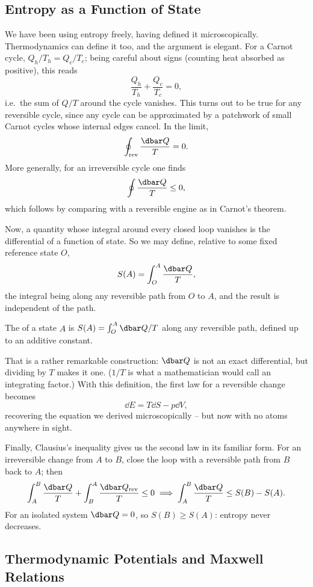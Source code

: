 \subsection{Entropy as a Function of State}

We have been using entropy freely, having defined it microscopically. Thermodynamics can define it too, and the argument is elegant. For a Carnot cycle, $Q_h/T_h = Q_c/T_c$; being careful about signs (counting heat absorbed as positive), this reads
$$
\frac{Q_h}{T_h} + \frac{Q_c}{T_c} = 0,
$$
i.e.\ the sum of $Q/T$ around the cycle vanishes. This turns out to be true for any reversible cycle, since any cycle can be approximated by a patchwork of small Carnot cycles whose internal edges cancel. In the limit,
$$
\oint_{\mathrm{rev}}\frac{\dbar Q}{T} = 0.
$$
More generally, for an irreversible cycle one finds 
$$
\oint \frac{\dbar Q}{T} \leq 0,
$$
which follows by comparing with a reversible engine as in Carnot's theorem.

Now, a quantity whose integral around every closed loop vanishes is the differential of a function of state. So we may define, relative to some fixed reference state $O$,
$$
S(A) = \int_O^A \frac{\dbar Q}{T},
$$
the integral being along any reversible path from $O$ to $A$, and the result is independent of the path.

\begin{definition}
	The  of a state $A$ is $S(A) = \int_O^A \dbar Q/T$ along any reversible path, defined up to an additive constant.
\end{definition}

That is a rather remarkable construction: $\dbar Q$ is not an exact differential, but dividing by $T$ makes it one. ($1/T$ is what a mathematician would call an integrating factor.) With this definition, the first law for a reversible change becomes
$$
\dd E = T\dd S - p\dd V,
$$
recovering the equation we derived microscopically -- but now with no atoms anywhere in sight.

Finally, Clausius's inequality gives us the second law in its familiar form. For an irreversible change from $A$ to $B$, close the loop with a reversible path from $B$ back to $A$; then
$$
\int_A^B \frac{\dbar Q}{T} + \int_B^A \frac{\dbar Q_{\mathrm{rev}}}{T} \leq 0 \implies \int_A^B\frac{\dbar Q}{T} \leq S(B) - S(A).
$$
For an isolated system $\dbar Q = 0$, so $S(B) \geq S(A)$: entropy never decreases.

\subsection{Thermodynamic Potentials and Maxwell Relations}\label{sec:potentials}

